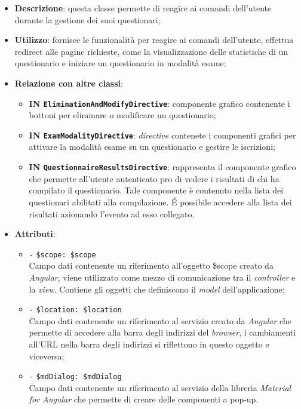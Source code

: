 \begin{itemize}
	\item \textbf{Descrizione}: questa classe permette di reagire ai comandi dell'utente durante la gestione dei suoi questionari;
	\item \textbf{Utilizzo}: fornisce le funzionalità per reagire ai comandi dell'utente, effettua redirect alle pagine richieste, come la visualizzazione delle statistiche di un questionario e iniziare un questionario in modalità esame;
	\item \textbf{Relazione con altre classi}:
	\begin{itemize}
		\item \textbf{IN \texttt{EliminationAndModifyDirective}}: componente grafico contenente i bottoni per eliminare o modificare un questionario;  
		\item \textbf{IN \texttt{ExamModalityDirective}}: \textit{directive} contenete i componenti grafici per attivare la modalità esame su un questionario e gestire le iscrizioni;
		\item \textbf{IN \texttt{QuestionnaireResultsDirective}}: rappresenta il componente grafico che permette all'utente autenticato pro di vedere i risultati di chi ha compilato il questionario. Tale componente è contenuto nella lista dei questionari abilitati alla compilazione. \'E possibile accedere alla lista dei risultati azionando l'evento ad esso collegato.
	\end{itemize}
	\item \textbf{Attributi}:
	\begin{itemize}
		\item \texttt{-} \texttt{\$scope: \$scope} \\
		Campo dati contenente un riferimento all'oggetto \$scope creato da \textit{Angular}, viene utilizzato come mezzo di comunicazione tra il \textit{controller} e la \textit{view}. Contiene gli oggetti che definiscono il \textit{model} dell'applicazione;
		\item \texttt{-} \texttt{\$location: \$location} \\
		Campo dati contenente un riferimento al servizio creato da \textit{Angular} che permette di accedere alla barra degli indirizzi del \textit{browser}, i cambiamenti all'URL nella barra degli indirizzi si riflettono in questo oggetto e viceversa;
		\item \texttt{-} \texttt{\$mdDialog: \$mdDialog} \\
		Campo dati contenente un riferimento al servizio della libreria \textit{Material for Angular} che permette di creare delle componenti a pop-up.

\end{itemize}
\end{itemize}
